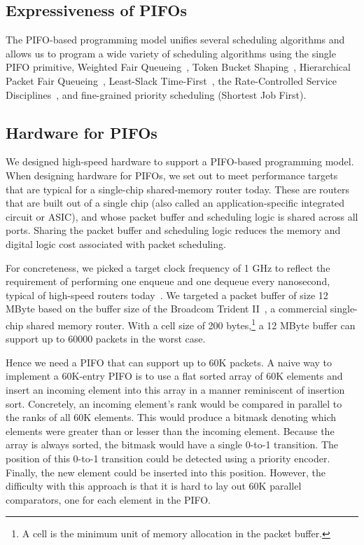 \subsection{Expressiveness of PIFOs}

The PIFO-based programming model unifies several scheduling algorithms and
allows us to program a wide variety of scheduling algorithms using the single
PIFO primitive, \eg Weighted Fair Queueing~\cite{wfq}, Token Bucket
Shaping~\cite{tbf}, Hierarchical Packet Fair Queueing~\cite{hpfq}, Least-Slack
Time-First~\cite{lstf}, the Rate-Controlled Service Disciplines~\cite{rcsd},
and fine-grained priority scheduling (\eg Shortest Job First).

\subsection{Hardware for PIFOs}
\label{ss:intro_pifo_hardware}

We designed high-speed hardware to support a PIFO-based programming model. When
designing hardware for PIFOs, we set out to meet performance targets that are
typical for a single-chip shared-memory router today. These are routers that
are built out of a single chip (also called an application-specific integrated
circuit or ASIC), and whose packet buffer and scheduling logic is shared across
all ports. Sharing the packet buffer and scheduling logic reduces the memory
and digital logic cost associated with packet scheduling.

For concreteness, we picked a target clock frequency of 1 GHz to reflect the
requirement of performing one enqueue and one dequeue every nanosecond, typical
of high-speed routers today~\cite{rmt}. We targeted a packet buffer of size 12
MByte based on the buffer size of the Broadcom Trident II~\cite{bcom_buffer}, a
commercial single-chip shared memory router. With a cell size of 200
bytes,\footnote{A cell is the minimum unit of memory allocation in the packet
buffer.} a 12 MByte buffer can support up to 60000 packets in the worst case.

Hence we need a PIFO that can support up to 60K packets. A naive way to
implement a 60K-entry PIFO is to use a flat sorted array of 60K elements and
insert an incoming element into this array in a manner reminiscent of insertion
sort. Concretely, an incoming element's rank would be compared in parallel to
the ranks of all 60K elements. This would produce a bitmask denoting which
elements were greater than or lesser than the incoming element.  Because the
array is always sorted, the bitmask would have a single 0-to-1 transition.  The
position of this 0-to-1 transition could be detected using a priority encoder.
Finally, the new element could be inserted into this position.  However, the
difficulty with this approach is that it is hard to lay out 60K parallel
comparators, one for each element in the PIFO.

